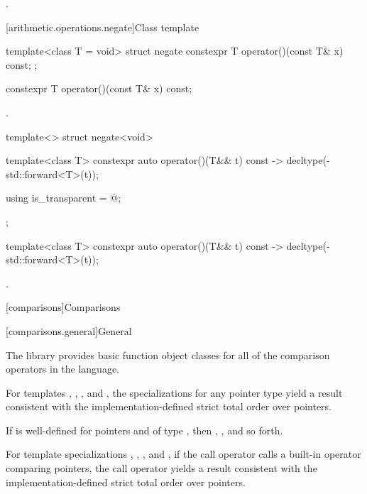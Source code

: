 \begin{itemdescr}
\pnum
\returns
{}.
\end{itemdescr}

[arithmetic.operations.negate]{Class template }

%
\begin{itemdecl}
template<class T = void> struct negate {
  constexpr T operator()(const T& x) const;
};
\end{itemdecl}

%
\begin{itemdecl}
constexpr T operator()(const T& x) const;
\end{itemdecl}

\begin{itemdescr}
\pnum
\returns
{}.
\end{itemdescr}

%
\begin{itemdecl}
template<> struct negate<void> {
  template<class T> constexpr auto operator()(T&& t) const
    -> decltype(-std::forward<T>(t));

  using is_transparent = @\unspec@;
};
\end{itemdecl}

%
\begin{itemdecl}
template<class T> constexpr auto operator()(T&& t) const
  -> decltype(-std::forward<T>(t));
\end{itemdecl}

\begin{itemdescr}
\pnum
\returns
{}.
\end{itemdescr}


[comparisons]{Comparisons}

[comparisons.general]{General}

\pnum
The library provides basic function object classes for all of the comparison
operators in the language.

\pnum
For templates , , , and
, the specializations for any pointer type
yield a result consistent with the
implementation-defined strict total order over pointers.
\begin{note}
If  is well-defined
for pointers  and  of type ,
then ,
, and so forth.
\end{note}
For template specializations , ,
, and ,
if the call operator calls a built-in operator comparing pointers,
the call operator yields a result consistent
with the implementation-defined strict total order over pointers.

